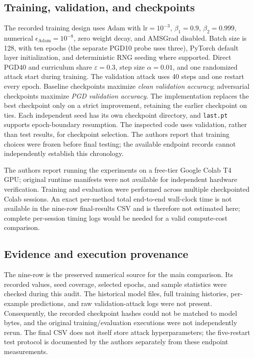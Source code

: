 \documentclass[11pt,a4paper]{article}
\begin{document}
\subsection{Training, validation, and checkpoints}
The recorded training design uses Adam \citep{kingma2015adam} with $\mathrm{lr}=10^{-3}$, $\beta_1=0.9$, $\beta_2=0.999$, numerical $\epsilon_{\mathrm{Adam}}=10^{-8}$, zero weight decay, and AMSGrad disabled. Batch size is 128, with ten epochs (the separate PGD10 probe uses three), PyTorch default layer initialization, and deterministic RNG seeding where supported. Direct PGD40 and curriculum share $\varepsilon=0.3$, step size $\alpha=0.01$, and one randomized attack start during training. The validation attack uses 40 steps and one restart every epoch. Baseline checkpoints maximize \emph{clean validation accuracy}; adversarial checkpoints maximize \emph{PGD validation accuracy}. The implementation replaces the best checkpoint only on a strict improvement, retaining the earlier checkpoint on ties. Each independent seed has its own checkpoint directory, and \texttt{last.pt} supports epoch-boundary resumption. The inspected code uses validation, rather than test results, for checkpoint selection. The authors report that training choices were frozen before final testing; the available endpoint records cannot independently establish this chronology.

The authors report running the experiments on a free-tier Google Colab T4 GPU; original runtime manifests were not available for independent hardware verification. Training and evaluation were performed across multiple checkpointed Colab sessions. An exact per-method total end-to-end wall-clock time is not available in the nine-row final-results CSV and is therefore not estimated here; complete per-session timing logs would be needed for a valid compute-cost comparison.

\subsection{Evidence and execution provenance}
The nine-row  is the preserved numerical source for the main comparison. Its recorded values, seed coverage, selected epochs, and sample statistics were checked during this audit. The historical model files, full training histories, per-example predictions, and raw validation-attack logs were not present. Consequently, the recorded checkpoint hashes could not be matched to model bytes, and the original training/evaluation executions were not independently rerun. The final CSV does not itself store attack hyperparameters; the five-restart test protocol is documented by the authors separately from these endpoint measurements.
\end{document}
